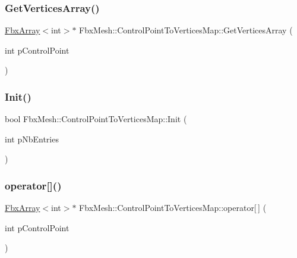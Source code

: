 \subsubsection{\texorpdfstring{Get\+Vertices\+Array()}{GetVerticesArray()}}
{\footnotesize\ttfamily \hyperlink{class_fbx_array}{Fbx\+Array}$<$int$>$$\ast$ Fbx\+Mesh\+::\+Control\+Point\+To\+Vertices\+Map\+::\+Get\+Vertices\+Array (\begin{DoxyParamCaption}\item[{int}]{p\+Control\+Point }\end{DoxyParamCaption})}

\mbox{\label{class_fbx_mesh_1_1_control_point_to_vertices_map_a30fd6a395444a8d74573afac1b9938b0}} 
\subsubsection{\texorpdfstring{Init()}{Init()}}
{\footnotesize\ttfamily bool Fbx\+Mesh\+::\+Control\+Point\+To\+Vertices\+Map\+::\+Init (\begin{DoxyParamCaption}\item[{int}]{p\+Nb\+Entries }\end{DoxyParamCaption})}

\mbox{\label{class_fbx_mesh_1_1_control_point_to_vertices_map_a1f73d39ced81f85a0eb91d4b9c4d6a2c}} 
\subsubsection{\texorpdfstring{operator[]()}{operator[]()}}
{\footnotesize\ttfamily \hyperlink{class_fbx_array}{Fbx\+Array}$<$int$>$$\ast$ Fbx\+Mesh\+::\+Control\+Point\+To\+Vertices\+Map\+::operator\mbox{[}$\,$\mbox{]} (\begin{DoxyParamCaption}\item[{int}]{p\+Control\+Point }\end{DoxyParamCaption})}

